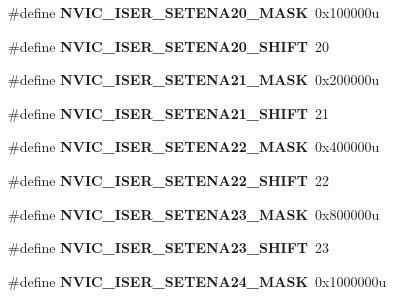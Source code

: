 \begin{DoxyCompactItemize}
\#define {\bfseries N\+V\+I\+C\+\_\+\+I\+S\+E\+R\+\_\+\+S\+E\+T\+E\+N\+A20\+\_\+\+M\+A\+SK}~0x100000u
\item 
\mbox{\label{group___n_v_i_c___register___masks_gabb296e60c902c143c2b00c615fae9bdb}} 
\#define {\bfseries N\+V\+I\+C\+\_\+\+I\+S\+E\+R\+\_\+\+S\+E\+T\+E\+N\+A20\+\_\+\+S\+H\+I\+FT}~20
\item 
\mbox{\label{group___n_v_i_c___register___masks_gaefdcd89f0095b4f9412445756eb196e6}} 
\#define {\bfseries N\+V\+I\+C\+\_\+\+I\+S\+E\+R\+\_\+\+S\+E\+T\+E\+N\+A21\+\_\+\+M\+A\+SK}~0x200000u
\item 
\mbox{\label{group___n_v_i_c___register___masks_ga1c347c5bcfe46f144acb62466bd93542}} 
\#define {\bfseries N\+V\+I\+C\+\_\+\+I\+S\+E\+R\+\_\+\+S\+E\+T\+E\+N\+A21\+\_\+\+S\+H\+I\+FT}~21
\item 
\mbox{\label{group___n_v_i_c___register___masks_ga542109bead7b2966da7dedbd5c3da058}} 
\#define {\bfseries N\+V\+I\+C\+\_\+\+I\+S\+E\+R\+\_\+\+S\+E\+T\+E\+N\+A22\+\_\+\+M\+A\+SK}~0x400000u
\item 
\mbox{\label{group___n_v_i_c___register___masks_ga5911e8143eefe6136de13ee08eef8e0c}} 
\#define {\bfseries N\+V\+I\+C\+\_\+\+I\+S\+E\+R\+\_\+\+S\+E\+T\+E\+N\+A22\+\_\+\+S\+H\+I\+FT}~22
\item 
\mbox{\label{group___n_v_i_c___register___masks_ga865d83bfaf691707aa4018f70a180919}} 
\#define {\bfseries N\+V\+I\+C\+\_\+\+I\+S\+E\+R\+\_\+\+S\+E\+T\+E\+N\+A23\+\_\+\+M\+A\+SK}~0x800000u
\item 
\mbox{\label{group___n_v_i_c___register___masks_ga7a35c2c41016457dafda0bfdfcc5c149}} 
\#define {\bfseries N\+V\+I\+C\+\_\+\+I\+S\+E\+R\+\_\+\+S\+E\+T\+E\+N\+A23\+\_\+\+S\+H\+I\+FT}~23
\item 
\mbox{\label{group___n_v_i_c___register___masks_ga6e10a9dbee7fc4051eb5f0b8317611d7}} 
\#define {\bfseries N\+V\+I\+C\+\_\+\+I\+S\+E\+R\+\_\+\+S\+E\+T\+E\+N\+A24\+\_\+\+M\+A\+SK}~0x1000000u

\end{DoxyCompactItemize}
